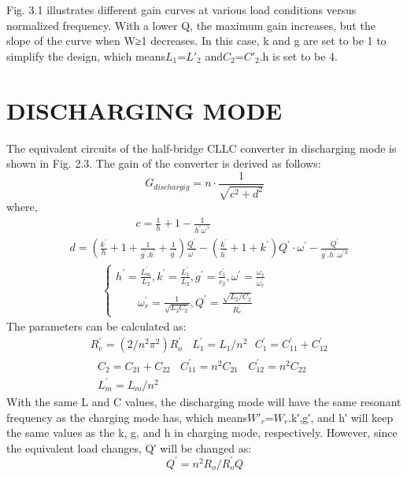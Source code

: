 \documentclass{book}
\begin{document}
Fig. 3.1 illustrates different gain curves at various load conditions versus normalized frequency. With a lower Q, the maximum gain increases, but the slope of the curve when W≥1 decreases. In this case, k and g are set to be 1 to simplify the design, which means\( L_{1}  \)=\( L'_{2}  \) and\( C_{2}  \)=\( C'_{2}  \).h is set to be 4.
\section{DISCHARGING MODE}
The equivalent circuits of the half-bridge CLLC converter in discharging mode is shown in Fig. 2.3. The gain of the converter is derived as follows:
\begin{equation*} G_{dischargig} =n \cdot\frac{1}{\sqrt{c^{2}+d^{2}}}  \end{equation*}
where, 
\begin{align*} &\qquad\qquad\qquad c=\frac{1}{h}+1-\frac{1}{h^{\prime}\omega^{{}^{\prime 2}}} \\ &d=\left(\frac{k^{\prime}}{h}+1+\frac{1}{g^{\prime}.h^{\prime}}+\frac{1}{g^{\prime}}\right)\frac{Q^{\prime}}{\omega^{\prime}}- (\frac{k^{\prime}}{h^{\prime}}+1+k^{\prime}) Q^{\prime}\cdot\omega^{\prime}-\frac{Q^{\prime}}{g^{\prime}.h^{\prime}.\omega^{\prime 3}}\\ &\ \ \ \ \qquad\begin{cases} h^{\prime}=\frac{L_{m}^{\prime}}{L_{2}}, k^{\prime}=\frac{L_{1}^{\prime}}{L_{2}}, g^{\prime}=\frac{c_{1}^{\prime}}{c_{2}}, \omega^{\prime}=\frac{\omega_{s}}{\omega_{r}^{\prime}}\\ \qquad\omega_{r}^{\prime}=\frac{1}{\sqrt{L_{2}C_{2}}}, Q^{\prime}=\frac{\sqrt{L_{2}/C_{2}}}{R_{e}^{\prime}} \end{cases} \end{align*}
The parameters can be calculated as:
\begin{align*} &R_{e}^{\prime}=(2/n^{2}\pi^{2}) R_{o}^{\prime}\ \ \ \ L_{1}^{\prime}=L_{1}/n^{2}\ \ \ C_{1}^{\prime}=C_{11}^{\prime}+C_{12}^{\prime}\\ &\ \ \ C_{2}=C_{21}+C_{22}\ \ \ \ C_{11}^{\prime}=n^{2}C_{21}\ \ \ \ C_{12}^{\prime}=n^{2}C_{22} \\ &\ \ \ L_{m}^{\prime}=L_{m}/n^{2}\end{align*}
	With the same L and C values, the discharging mode will have the same resonant frequency as the charging mode has, which means\( W'_{r}  \)=\( W_{r}  \).k′,g′, and h′ will keep the same values as the k, g, and h in charging mode, respectively. However, since the equivalent load changes, Q′ will be changed as:
    \begin{equation*} Q^{\prime}=n^{2}R_{o}/R_{o}^{\prime}Q \end{equation*}
        
\end{document}
